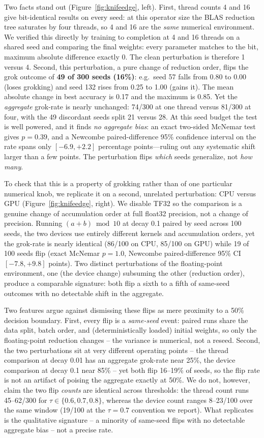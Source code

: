 \documentclass[10pt]{article} %
\begin{document}
Two facts stand out (Figure~\ref{fig:knifeedge}, left). First, thread counts 4 and 16 give
bit-identical results on every seed: at this operator size the BLAS reduction tree saturates by
four threads, so 4 and 16 are the \emph{same} numerical environment. We verified this directly by
training to completion at 4 and 16 threads on a shared seed and comparing the final weights: every
parameter matches to the bit, maximum absolute difference exactly $0$. The clean perturbation is
therefore 1 versus 4. Second, this perturbation, a pure change of reduction order, flips the grok
outcome of \textbf{49 of 300 seeds (16\%)}: e.g.\ seed 57 falls from 0.80 to 0.00 (loses grokking)
and seed 132 rises from 0.25 to 1.00 (gains it). The mean absolute change in best accuracy is 0.17
and the maximum is 0.85. Yet the \emph{aggregate} grok-rate is nearly unchanged: 74/300 at one
thread versus 81/300 at four, with the 49 discordant seeds split 21 versus 28. At this seed budget
the test is well powered, and it finds \emph{no aggregate bias}: an exact two-sided McNemar test
gives $p=0.39$, and a Newcombe paired-difference 95\% confidence interval on the rate spans only
$[-6.9, +2.2]$ percentage points---ruling out any systematic shift larger than a few points. The
perturbation flips \emph{which} seeds generalize, not \emph{how many}.

To check that this is a property of grokking rather than of one particular numerical knob, we
replicate it on a second, unrelated perturbation: CPU versus GPU (Figure~\ref{fig:knifeedge},
right). We disable TF32 so the comparison is a genuine change of accumulation order at full
float32 precision, not a change of precision. Running $(a{+}b)\bmod 10$ at decay 0.1 paired by seed
across 100 seeds, the two devices use entirely different kernels and accumulation orders, yet the
grok-rate is nearly identical (86/100 on CPU, 85/100 on GPU) while 19 of 100 seeds flip (exact
McNemar $p=1.0$, Newcombe paired-difference 95\% CI $[-7.8, +9.8]$ points).
Two distinct perturbations of the floating-point environment, one (the device change) subsuming the
other (reduction order), produce a comparable signature: both flip a sixth to a fifth of same-seed
outcomes with no detectable shift in the aggregate.

Two features argue against dismissing these flips as mere proximity to a 50\% decision boundary.
First, every flip is a \emph{same-seed} event: paired runs share the data split, batch order, and
(deterministically loaded) initial weights, so only the floating-point reduction changes -- the
variance is numerical, not a reseed. Second, the two
perturbations sit at very different operating points -- the thread comparison at decay 0.01 has an
aggregate grok-rate near 25\%, the device comparison at decay 0.1 near 85\% -- yet both flip
16--19\% of seeds, so the flip rate is not an artifact of poising the aggregate exactly at 50\%. We do
not, however, claim the two flip \emph{counts} are identical across thresholds: the thread count runs
45--62/300 for $\tau\in\{0.6,0.7,0.8\}$, whereas the device count ranges 8--23/100 over the same
window (19/100 at the $\tau=0.7$ convention we report). What replicates is the qualitative signature --
a minority of same-seed flips with no detectable aggregate bias -- not a precise rate.
\end{document}
